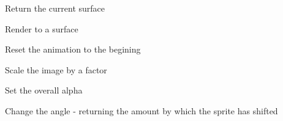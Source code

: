 \documentclass[letterpaper,10pt,english]{sphinxmanual}
\begin{document}
\begin{fulllineitems}
\begin{fulllineitems}
\label{visual:serge.visual.Sprite.getSurface}
Return the current surface

\end{fulllineitems}


\begin{fulllineitems}
\label{visual:serge.visual.Sprite.renderTo}
Render to a surface

\end{fulllineitems}


\begin{fulllineitems}
\label{visual:serge.visual.Sprite.resetAnimation}
Reset the animation to the begining

\end{fulllineitems}


\begin{fulllineitems}
\label{visual:serge.visual.Sprite.scaleBy}
Scale the image by a factor

\end{fulllineitems}


\begin{fulllineitems}
\label{visual:serge.visual.Sprite.setAlpha}
Set the overall alpha

\end{fulllineitems}


\begin{fulllineitems}
\label{visual:serge.visual.Sprite.setAngle}
Change the angle - returning the amount by which the sprite has shifted

\end{fulllineitems}


\end{fulllineitems}
\end{document}
